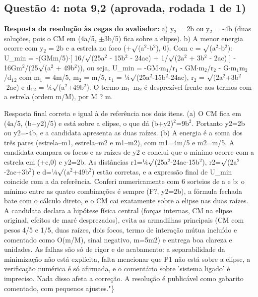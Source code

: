 \documentclass{article}%
\begin{document}
\subsection*{Questão 4: nota 9,2 (aprovada, rodada 1 de 1)}%
\textbf{Resposta da resolução às cegas do avaliador:} a) y$_{2}$ = 2b ou y$_{2}$ = -4b (duas soluções, pois o CM em (4a/5, $\pm$3b/5) fica sobre a elipse).\newline%
\newline%
b) A menor energia ocorre com y$_{2}$ = 2b e a estrela no foco (+$\surd$(a$^2$-b$^2$), 0). Com c = $\surd$(a$^2$-b$^2$):\newline%
\newline%
U\_min = -(GMm/5)$\cdot${[} 16/$\surd$(25a$^2$ - 15b$^2$ - 24ac) + 1/$\surd$(2a$^2$ + 3b$^2$ - 2ac) {]} - 16Gm$^2$/(25$\surd$(a$^2$ + 49b$^2$)),\newline%
\newline%
ou seja, U\_min = -GM$\cdot$m$_{1}$/r$_{1}$ - GM$\cdot$m$_{2}$/r$_{2}$ - G$\cdot$m$_{1}$m$_{2}$/d$_{1}$$_{2}$ com m$_{1}$ = 4m/5, m$_{2}$ = m/5, r$_{1}$ = ¼$\surd$(25a$^2$-15b$^2$-24ac), r$_{2}$ = $\surd$(2a$^2$+3b$^2$-2ac) e d$_{1}$$_{2}$ = ¼$\surd$(a$^2$+49b$^2$). O termo m$_{1}$--m$_{2}$ é desprezível frente aos termos com a estrela (ordem m/M), por M ? m.\par %
Resposta final correta e igual à de referência nos dois itens. (a) O CM fica em (4a/5, (b+y2)/5) e está sobre a elipse, o que dá (b+y2)$^2$=9b$^2$. Portanto y2=2b ou y2=-4b, e a candidata apresenta as duas raízes. (b) A energia é a soma dos três pares (estrela--m1, estrela--m2 e m1--m2), com m1=4m/5 e m2=m/5. A candidata compara os focos e as raízes de y2 e conclui que o mínimo ocorre com a estrela em (+c,0) e y2=2b. As distâncias r1=¼$\surd$(25a$^2$-24ac-15b$^2$), r2=$\surd$(2a$^2$-2ac+3b$^2$) e d=¼$\surd$(a$^2$+49b$^2$) estão corretas, e a expressão final de U\_min coincide com a da referência. Conferi numericamente com 6 sorteios de a e b: o mínimo entre as quatro combinações é sempre (F?, y2=2b), a fórmula fechada bate com o cálculo direto, e o CM cai exatamente sobre a elipse nas duas raízes. A candidata declara a hipótese física central (forças internas, CM na elipse original, efeitos de maré desprezados), evita as armadilhas principais (CM com pesos 4/5 e 1/5, duas raízes, dois focos, termo de interação mútua incluído e comentado como O(m/M), sinal negativo, m=5m2) e entrega boa clareza e unidades. As falhas são só de rigor e de acabamento: a separabilidade da minimização não está explícita, falta mencionar que P1 não está sobre a elipse, a verificação numérica é só afirmada, e o comentário sobre 'sistema ligado' é impreciso. Nada disso afeta a correção. A resolução é publicável como gabarito comentado, com pequenos ajustes."\}%
\end{document}
